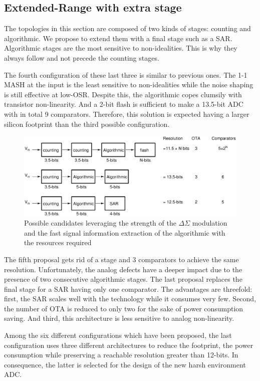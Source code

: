 \subsection{Extended-Range with extra stage}
The topologies in this section are composed of two kinds of stages: counting and algorithmic. We propose to extend them with a final stage such as a SAR\@. Algorithmic stages are the most sensitive to non-idealities. This is why they always follow and not precede the counting stages.

The fourth configuration of these last three is similar to previous ones. The 1-1 MASH at the input is the least sensitive to non-idealities while the noise shaping is still effective at low-OSR\@. Despite this, the algorithmic copes clumsily with transistor non-linearity. And a 2-bit flash is sufficient to make a 13.5-bit ADC with in total 9 comparators. Therefore, this solution is expected having a larger silicon footprint than the third possible configuration.

\begin{figure}[htp]
	\centering
	\includegraphics[width=.9\textwidth]{Chapter4/Figs/study/counting-algo-conversion.ps}
	\caption{Possible candidates leveraging the strength of the \(\Delta \Sigma\) modulation and the fast signal information extraction of the algorithmic with the resources required }
	\label{fig:counting-algo-candidates}
\end{figure}

The fifth proposal gets rid of a stage and 3 comparators to achieve the same resolution. Unfortunately, the analog defects have a deeper impact due to the presence of two consecutive algorithmic stages. The last proposal replaces the final stage for a SAR having only one comparator. The advantages are threefold: first, the SAR scales well with the technology while it consumes very few. Second, the number of OTA is reduced to only two for the sake of power consumption saving. And third, this architecture is less sensitive to analog non-linearity.

Among the six different configurations which have been proposed, the last configuration uses three different architectures to reduce the footprint, the power consumption while preserving a reachable resolution greater than 12-bits. In consequence, the latter is selected for the design of the new harsh environment ADC\@.

